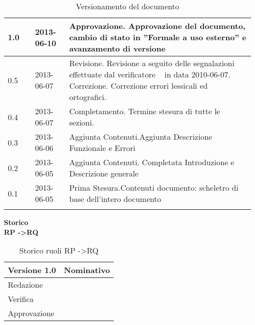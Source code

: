 \begin{longtable}{p{} p{} p{} p{}}
\midrule
1.0	&	\FZ &	2013-06-10 	&	Approvazione.\newline
						Approvazione del documento, cambio di stato in ”Formale a uso esterno” e avanzamento di versione\\
\midrule
0.5	&	\VP &	2013-06-07 	&	Revisione.\newline
						Revisione a seguito delle segnalazioni effettuate dal verificatore \EZ~ in data 2010-06-07.\newline
						Correzione.\newline
						Correzione errori lessicali ed ortografici.\\
\midrule
0.4	&	\VP &	2013-06-07 	&	Completamento.\newline
						Termine stesura di tutte le sezioni.\\
\midrule
0.3	&	\VP &	2013-06-06 	&	Aggiunta Contenuti.\newline Aggiunta Descrizione Funzionale e Errori\\
\midrule
0.2	&	\VP &	2013-06-05 	&	Aggiunta Contenuti.\newline
						Completata Introduzione e Descrizione generale\\
\midrule
0.1	&	\VP &	2013-06-05 	&	Prima Stesura.\newline Contenuti documento: scheletro di base dell'intero documento\\
\bottomrule

\caption{Versionamento del documento}
\end{longtable}

\newpage

\Large{\textbf{Storico }}\\
\normalsize
\textbf{RP -\textgreater RQ}

\begin{table}[h]
\begin{center}

\begin{tabular}{p{} p{}}
\toprule
\textbf{Versione 1.0}	&	\textbf{Nominativo}\\
\midrule
\midrule
Redazione	&	\VP \\
\midrule
Verifica &	\EZ	\\
\midrule
Approvazione	&	\FZ	\\
\bottomrule
\end{tabular}
\caption{Storico ruoli RP -\textgreater RQ}
\label{tabVers1}
\end{center}
\end{table}


